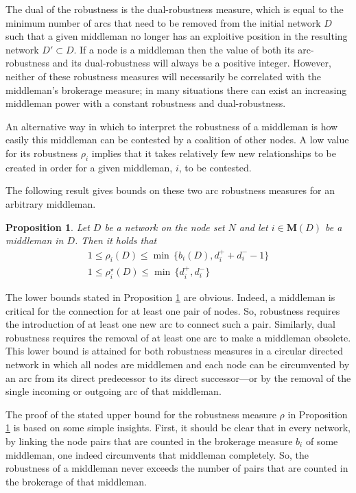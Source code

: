 \documentclass[11pt,fleqn]{article}
\newtheorem{proposition}[theorem]{Proposition}
\begin{document}
The dual of the robustness is the dual-robustness measure, which is equal to the minimum number of arcs that need to be removed from the initial network $D$ such that a given middleman no longer has an exploitive position in the resulting network $D' \subset D$. If a node is a middleman then the value of both its arc-robustness and its dual-robustness will always be a positive integer. However, neither of these robustness measures will necessarily be correlated with the middleman's brokerage measure; in many situations there can exist an increasing middleman power with a constant robustness and dual-robustness.

An alternative way in which to interpret the robustness of a middleman is how easily this middleman can be contested by a coalition of other nodes. A low value for its robustness $\rho_{i}$ implies that it takes relatively few new relationships to be created in order for a given middleman, $i$, to be contested.

The following result gives bounds on these two arc robustness measures for an arbitrary middleman.
\begin{proposition} \label{prop:bounds}
	Let $D$ be a network on the node set $N$ and let $i \in \mathbf M (D)$ be a middleman in $D$. Then it holds that
	\begin{gather}
		1 \leqslant \rho_i (D) \leqslant \min \, \{ b_i (D) , d^+_i + d^-_i -1 \} \\
		1 \leqslant \rho^{\star}_i (D) \leqslant \min \, \{ d^+_i , d^-_i \}
	\end{gather}
\end{proposition}

\noindent
The lower bounds stated in Proposition \ref{prop:bounds} are obvious. Indeed, a middleman is critical for the connection for at least one pair of nodes. So, robustness requires the introduction of at least one new arc to connect such a pair. Similarly, dual robustness requires the removal of at least one arc to make a middleman obsolete. This lower bound is attained for both robustness measures in a circular directed network in which all nodes are middlemen and each node can be circumvented by an arc from its direct predecessor to its direct successor---or by the removal of the single incoming or outgoing arc of that middleman.

The proof of the stated upper bound for the robustness measure $\rho$ in Proposition \ref{prop:bounds} is based on some simple insights. First, it should be clear that in every network, by linking the node pairs that are counted in the brokerage measure $b_i$ of some middleman, one indeed circumvents that middleman completely. So, the robustness of a middleman never exceeds the number of pairs that are counted in the brokerage of that middleman.
\end{document}
